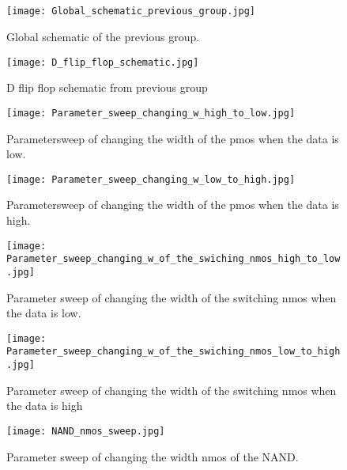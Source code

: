 \begin{appendices}
\section{}\label{sec:appendix}
\begin{figure}[h]
\texttt{[image: Global\_schematic\_previous\_group.jpg]}
\caption{Global schematic of the previous group.}
\label{fig:Global_schematic_previous_group_figure}
\end{figure}

\begin{figure}[h]
 \texttt{[image: D\_flip\_flop\_schematic.jpg]}
 \caption{ D flip flop schematic from previous group}
 \label{fig:D_flip_flop_ previous_group_figure}
\end{figure}

\begin{figure}[h]
 \texttt{[image: Parameter\_sweep\_changing\_w\_high\_to\_low.jpg]}
 \caption{Parametersweep of changing the width of the pmos when the data is low.}
 \label{fig:parametersweep_changing_w_high_to_low_figure}
\end{figure}

\begin{figure}[h]
 \texttt{[image: Parameter\_sweep\_changing\_w\_low\_to\_high.jpg]}
 \caption{Parametersweep of changing the width of the pmos when the data is high.}
 \label{fig:parametersweep_changing_w_low_to_high_figure}
\end{figure}

\begin{figure}[h]
 \texttt{[image: Parameter\_sweep\_changing\_w\_of\_the\_swiching\_nmos\_high\_to\_low.jpg]}
 \caption{Parameter sweep of changing the width of the switching nmos when the data is low.}
 \label{fig:Parameter_sweep_changing_w_of_the_swiching_nmos_high_to_low_figure}
\end{figure}

\begin{figure}[h]
 \texttt{[image: Parameter\_sweep\_changing\_w\_of\_the\_swiching\_nmos\_low\_to\_high.jpg]}
 \caption{Parameter sweep of changing the width of the switching nmos when the data is high}
 \label{fig:Parameter_sweep_changing_w_of_the_swiching_nmos_low_to_high_figure}
\end{figure}

\begin{figure}[h]
 \texttt{[image: NAND\_nmos\_sweep.jpg]}
 \caption{Parameter sweep of changing the width nmos of the NAND.}
 \label{fig:NAND_nmos_sweep_figure}
\end{figure}


\end{appendices}
